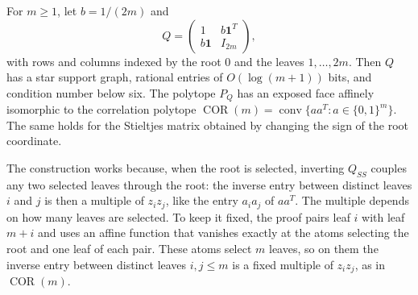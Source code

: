 \begin{theorem}\label{thm:star-face}
For $m\ge1$, let $b=1/(2m)$ and
\[
 Q=\begin{pmatrix}1&b\mathbf1^T\\b\mathbf1&I_{2m}\end{pmatrix},
\]
with rows and columns indexed by the root $0$ and the leaves
$1,\ldots,2m$. Then $Q$ has a star support graph, rational entries of
$O(\log(m+1))$ bits, and condition number below six. The polytope $P_Q$
has an exposed face affinely isomorphic to the correlation polytope
$\operatorname{COR}(m)=\operatorname{conv}\{aa^T:a\in\{0,1\}^m\}$.
The same holds for the Stieltjes matrix obtained by changing the sign of
the root coordinate.
\end{theorem}
The construction works because, when the root is selected, inverting
$Q_{SS}$ couples any two selected leaves through the root: the inverse
entry between distinct leaves $i$ and $j$ is then a multiple of
$z_iz_j$, like the entry $a_ia_j$ of $aa^T$. The multiple depends on how
many leaves are selected. To keep it fixed, the proof pairs leaf $i$
with leaf $m+i$ and uses an affine function that vanishes exactly at the
atoms selecting the root and one leaf of each pair. These atoms select
$m$ leaves, so on them the inverse entry between distinct leaves
$i,j\le m$ is a fixed multiple of $z_iz_j$, as in
$\operatorname{COR}(m)$.
